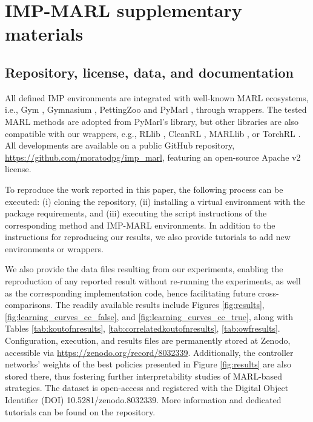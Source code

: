 \chapter{IMP-MARL supplementary materials} \label{ch:ch5_appendix}
\section{Repository, license, data, and documentation}
\label{sec:ch5_appendix_imp_public_repo}

All defined IMP environments are integrated with well-known MARL ecosystems, i.e., Gym \citep{openaigym}, Gymnasium \citep{towers_gymnasium_2023}, PettingZoo \citep{terry2021pettingzoo} and PyMarl \citep{samvelyan2019starcraft}, through wrappers.
The tested MARL methods are adopted from PyMarl's library, but other libraries are also compatible with our wrappers, e.g., RLlib \citep{liang2018rllib}, CleanRL \citep{huang2022cleanrl}, MARLlib \citep{hu2022marllib}, or TorchRL \citep{bou2023torchrl}.
All developments are available on a public GitHub repository, \url{https://github.com/moratodpg/imp\_marl}, featuring an open-source Apache v2 license.

To reproduce the work reported in this paper, the following process can be executed: (i) cloning the repository, (ii) installing a virtual environment with the package requirements, and (iii) executing the script instructions of the corresponding method and IMP-MARL environments.
In addition to the instructions for reproducing our results, we also provide tutorials to add new environments or wrappers.

We also provide the data files resulting from our experiments, enabling the reproduction of any reported result without re-running the experiments, as well as the corresponding implementation code, hence facilitating future cross-comparisons.
The readily available results include Figures \ref{fig:results}, \ref{fig:learning_curves_cc_false}, and \ref{fig:learning_curves_cc_true}, along with Tables \ref{tab:koutofnresults}, \ref{tab:correlatedkoutofnresults}, \ref{tab:owfresults}.
Configuration, execution, and results files are permanently stored at Zenodo, accessible via \url{https://zenodo.org/record/8032339}. 
Additionally, the controller networks' weights of the best policies presented in Figure \ref{fig:results} are also stored there, thus fostering further interpretability studies of MARL-based strategies.
The dataset is open-access and registered with the Digital Object Identifier (DOI) 10.5281/zenodo.8032339.
More information and dedicated tutorials can be found on the repository.

